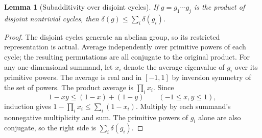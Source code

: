 \documentclass[11pt]{article}
\newtheorem{lemma}[theorem]{Lemma}
\theoremstyle{remark}\newtheorem{remark}[theorem]{Remark}
\begin{document}
\begin{lemma}[Subadditivity over disjoint cycles]\label{lem:subadd}
If $g=g_1\cdots g_j$ is the product of disjoint nontrivial cycles, then $\delta(g)\le\sum_i\delta(g_i)$.
\end{lemma}
\begin{proof}
The disjoint cycles generate an abelian group, so its restricted representation is actual. Average independently over primitive powers of each cycle; the resulting permutations are all conjugate to the original product. For any one-dimensional summand, let $x_i$ denote the average eigenvalue of $g_i$ over its primitive powers. The average is real and in $[-1,1]$ by inversion symmetry of the set of powers. The product average is $\prod_i x_i$. Since
\[
 1-xy\le(1-x)+(1-y)\qquad(-1\le x,y\le1),
\]
induction gives $1-\prod_i x_i\le\sum_i(1-x_i)$. Multiply by each summand's nonnegative multiplicity and sum. The primitive powers of $g_i$ alone are also conjugate, so the right side is $\sum_i\delta(g_i)$.
\end{proof}
\end{document}
